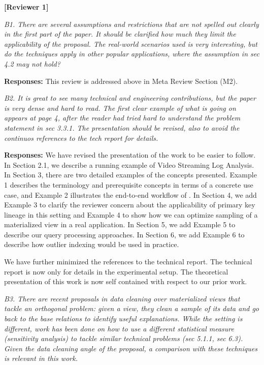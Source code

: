 \vspace{2em}
\noindent\textbf{[Reviewer 1]}
\vspace{1em}

\emph{B1. There are several assumptions and restrictions that are not spelled out clearly in the first part of the paper. It should be clarified how much they limit the applicability of the proposal. The real-world scenarios used is very interesting, but do the techniques apply in other popular applications, where the assumption in sec 4.2 may not hold?}

\vspace{.25em}

{\bf Responses:} This review is addressed above in Meta Review Section (M2).

\vspace{1em}
\emph{B2. It is great to see many technical and engineering contributions, but the paper is very dense and hard to read. The first clear example of what is going on appears at page 4, after the reader had tried hard to understand the problem statement in sec 3.3.1. The presentation should be revised, also to avoid the continuos references to the tech report for details.}

\vspace{.25em}

{\bf Responses:} We have revised the presentation of the work to be easier to follow. In Section 2.1, we describe a running example of Video Streaming Log Analysis. In Section 3, there are two detailed examples of the concepts presented. Example 1 describes the terminology and prerequisite concepts in terms of a concrete use case, and Example 2 illustrates the end-to-end workflow of \svc. In Section 4, we add Example 3 to clarify the reviewer concern about the applicability of primary key lineage in this setting and Example 4 to show how we can optimize sampling of a materialized view in a real application. In Section 5, we add Example 5 to describe our query processing approaches. In Section 6, we add Example 6 to describe how outlier indexing would be used in practice. 

We have further minimized the references to the technical report. The technical report is now only for details in the experimental setup. The theoretical presentation of this work is now self contained with respect to our prior work.

\vspace{1em}
\emph{B3. There are recent proposals in data cleaning over materialized views that tackle an orthogonal problem: given a view, they clean a sample of its data and go back to the base relations to identify useful explanations. While the setting is different, work has been done on how to use a different statistical measure (sensitivity analysis) to tackle similar technical problems (sec 5.1.1, sec 6.3). Given the data cleaning angle of the proposal, a comparison with these techniques is relevant in this work.}

